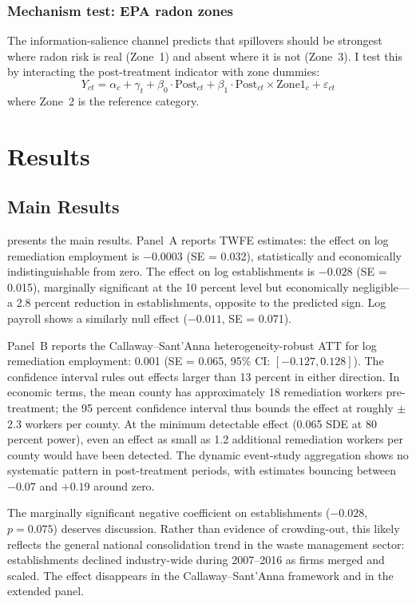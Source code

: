 \documentclass[12pt]{article}
\begin{document}
\subsubsection*{Mechanism test: EPA radon zones} The information-salience channel predicts that spillovers should be strongest where radon risk is real (Zone~1) and absent where it is not (Zone~3). I test this by interacting the post-treatment indicator with zone dummies:
\begin{equation}
Y_{ct} = \alpha_c + \gamma_t + \beta_0 \cdot \text{Post}_{ct} + \beta_1 \cdot \text{Post}_{ct} \times \text{Zone1}_c + \varepsilon_{ct}
\end{equation}
where Zone~2 is the reference category.

\section{Results}

\subsection{Main Results}



 presents the main results. Panel~A reports TWFE estimates: the effect on log remediation employment is $-0.0003$ (SE = 0.032), statistically and economically indistinguishable from zero. The effect on log establishments is $-0.028$ (SE = 0.015), marginally significant at the 10 percent level but economically negligible---a 2.8 percent reduction in establishments, opposite to the predicted sign. Log payroll shows a similarly null effect ($-0.011$, SE = 0.071).

Panel~B reports the Callaway--Sant'Anna heterogeneity-robust ATT for log remediation employment: 0.001 (SE = 0.065, 95\% CI: $[-0.127, 0.128]$). The confidence interval rules out effects larger than 13 percent in either direction. In economic terms, the mean county has approximately 18 remediation workers pre-treatment; the 95 percent confidence interval thus bounds the effect at roughly $\pm$2.3 workers per county. At the minimum detectable effect (0.065 SDE at 80 percent power), even an effect as small as 1.2 additional remediation workers per county would have been detected. The dynamic event-study aggregation shows no systematic pattern in post-treatment periods, with estimates bouncing between $-0.07$ and $+0.19$ around zero.

The marginally significant negative coefficient on establishments ($-0.028$, $p = 0.075$) deserves discussion. Rather than evidence of crowding-out, this likely reflects the general national consolidation trend in the waste management sector: establishments declined industry-wide during 2007--2016 as firms merged and scaled. The effect disappears in the Callaway--Sant'Anna framework and in the extended panel.
\end{document}
